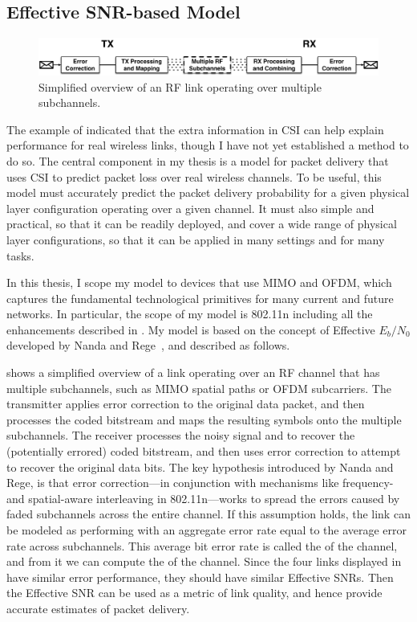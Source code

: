\subsection{Effective SNR-based Model}
\begin{figure}[t!]
	\centering
	\includegraphics[width=\textwidth]{figures/esnr_intuitive.pdf}
	\caption[Simplified overview of an RF link operating over multiple subchannels]{\label{fig:esnr_intuitive}Simplified overview of an RF link operating over multiple subchannels.}
\end{figure}

The example of  indicated that the extra information in CSI can help explain performance for real wireless links, though I have not yet established a method to do so. The central component in my thesis is a model for packet delivery that uses CSI to predict packet loss over real wireless channels. To be useful, this model must accurately predict the packet delivery probability for a given physical layer configuration operating over a given channel. It must also simple and practical, so that it can be readily deployed, and cover a wide range of physical layer configurations, so that it can be applied in many settings and for many tasks.

In this thesis, I scope my model to devices that use MIMO and OFDM, which captures the fundamental technological primitives for many current and future networks. In particular, the scope of my model is 802.11n including all the enhancements described in . My model is based on the concept of Effective $E_b/N_0$ developed by Nanda and Rege~\cite{Nanda_EffectiveSNR}, and described as follows.
 
 shows a simplified overview of a link operating over an RF channel that has multiple subchannels, such as MIMO spatial paths or OFDM subcarriers. The transmitter applies error correction to the original data packet, and then processes the coded bitstream and maps the resulting symbols onto the multiple subchannels. The receiver processes the noisy signal and to recover the (potentially errored) coded bitstream, and then uses error correction to attempt to recover the original data bits. The key hypothesis introduced by Nanda and Rege, is that error correction---in conjunction with mechanisms like frequency- and spatial-aware interleaving in 802.11n---works to spread the errors caused by faded subchannels across the entire channel. If this assumption holds, the link can be modeled as performing with an aggregate error rate equal to the average error rate across subchannels. This average bit error rate is called the  of the channel, and from it we can compute the  of the channel. Since the four links displayed in  have similar error performance, they should have similar Effective SNRs. Then the Effective SNR can be used as a metric of link quality, and hence provide accurate estimates of packet delivery.

